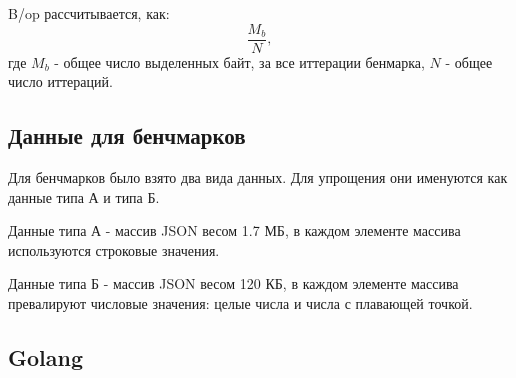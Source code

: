 B/op рассчитывается, как:
\begin{equation}
\dfrac{M_{b}}{N},
\end{equation}
где $M_{b}$ - общее число выделенных байт, за все иттерации бенмарка, $N$ - общее число иттераций.  

\subsection{Данные для бенчмарков}

Для бенчмарков было взято два вида данных. Для упрощения они именуются как данные типа А и типа Б.

Данные типа А - массив JSON весом 1.7 МБ, в каждом элементе массива используются строковые значения.  

Данные типа Б - массив JSON весом 120 КБ, в каждом элементе массива превалируют числовые значения: целые числа и числа с плавающей точкой.  

\clearpage
\subsection{Golang}

